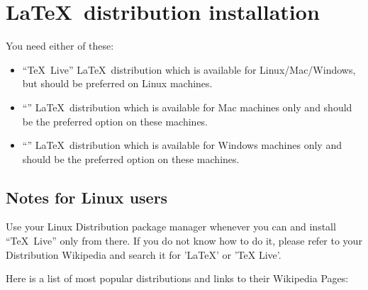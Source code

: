 \section{\LaTeX\ distribution installation}

You need either of these:
\begin{itemize}
    \item ``\TeX\ Live'' \LaTeX\ distribution which is available for
        Linux/Mac/Windows, but should be preferred on Linux machines.
    \item ``\MacTeX'' \LaTeX\ distribution which is available for Mac machines
        only and should be the preferred option on these machines.
    \item ``\MiKTeX'' \LaTeX\ distribution which is available for Windows machines
        only and should be the preferred option on these machines.
\end{itemize}

\subsection{Notes for Linux users}

Use your Linux Distribution package manager whenever you can and install
``\TeX\ Live'' only from there. If you do not know how to do it, please refer to
your Distribution Wikipedia and search it for 'LaTeX' or 'TeX Live'.

Here is a list of most popular distributions and links to their Wikipedia Pages:

